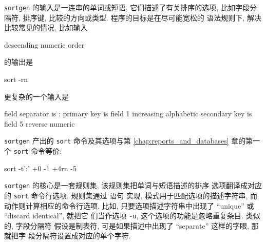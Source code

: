 \texttt{sortgen} 的输入是一连串的单词或短语, 它们描述了有关排序的选项,
比如字段分隔符, 排序键, 比较的方向或类型. 程序的目标是在尽可能宽松的
语法规则下, 解决比较常见的情况, 比如输入
\begin{file}
    descending numeric order
\end{file}
的输出是
\begin{shell}
    sort -rn
\end{shell}
更复杂的一个输入是
\begin{file}
    field separator is :
    primary key is field 1
        increasing alphabetic
    secondary key is field 5
        reverse numeric
\end{file}
\texttt{sortgen} 产出的 \texttt{sort} 命令及其选项与第
\ref{chap:reports_and_databases} 章的第一个 \texttt{sort} 命令等价:
\begin{shell}
    sort -t':' +0 -1 +4rn -5
\end{shell}

\texttt{sortgen} 的核心是一套规则集, 该规则集把单词与短语描述的排序
选项翻译成对应的 \texttt{sort} 命令行选项. 规则集通过 \patact 语句
实现, 模式用于匹配选项的描述字符串, 而动作则计算相应的命令行选项. 比如,
只要选项描述字符串中出现了 ``unique'' 或 ``discard identical'', 就把它
们当作选项 \texttt{-u}, 这个选项的功能是忽略重复条目. 类似的, 字段分隔符
假设是制表符, 可是如果描述中出现了 ``separate'' 这样的字眼, 那就把字
段分隔符设置成对应的单个字符.

